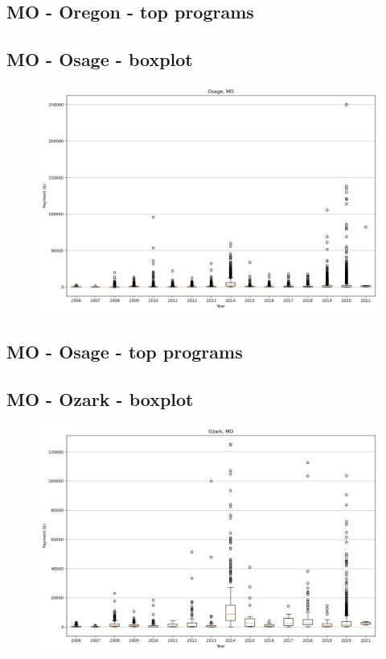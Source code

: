 \subsection*{MO - Oregon - top programs}

\newpage
\subsection*{MO - Osage - boxplot}
\begin{figure}[h]
\centering
\includegraphics[width=7in]{../output/boxplots/counties/Osage-MO_boxplot.png}
\end{figure}


\subsection*{MO - Osage - top programs}

\newpage
\subsection*{MO - Ozark - boxplot}
\begin{figure}[h]
\centering
\includegraphics[width=7in]{../output/boxplots/counties/Ozark-MO_boxplot.png}
\end{figure}


